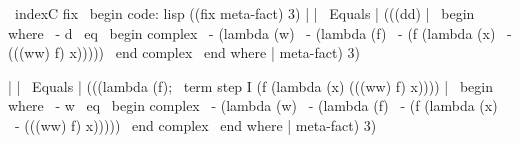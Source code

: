 {\ indexC {fix}
\ begin {code: lisp}
((fix meta-fact) 3)
| | \ Equals | (((dd) | \ begin {where}
                    \ - d { \ eq } \ begin {complex}
                              \ - (lambda (w)
                              \ -   (lambda (f)
                              \ -    (f (lambda (x)
                              \ -         (((ww) f) x)))))
                              \ end {complex}
                    \ end {where} |
     meta-fact)
    3)

| | \ Equals | (((lambda (f); \ term {step I}
       (f (lambda (x)
            (((ww) f) x)))) | \ begin {where}
                               \ - w { \ eq } \ begin {complex}
                                         \ - (lambda (w)
                                         \ -   (lambda (f)
                                         \ -    (f (lambda (x)
                                         \ -         (((ww) f) x)))))
                                         \ end {complex}
                              \ end {where} |
     meta-fact)
    3)

}
